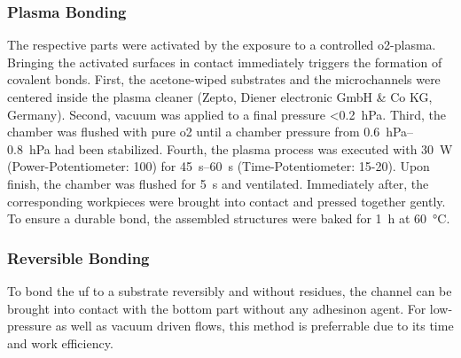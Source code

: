 \subsubsection{Plasma Bonding}
\label{sec:meth:bond:plasma}
The respective parts were activated by the exposure to a controlled \gls{o2}-plasma. Bringing the activated surfaces in contact immediately triggers the formation of covalent bonds. First, the acetone-wiped substrates and the microchannels were centered inside the plasma cleaner (Zepto, Diener electronic GmbH \& Co KG, Germany). Second, vacuum was applied to a final pressure <\SI{0.2}{\hecto\pascal}. Third, the chamber was flushed with pure \gls{o2} until a chamber pressure from \SIrange{0.6}{0.8}{\hecto\pascal} had been stabilized. Fourth, the plasma process was executed with \SI{30}{\watt} (Power-Potentiometer: 100) for \SIrange{45}{60}{\second} (Time-Potentiometer: 15-20). Upon finish, the chamber was flushed for \SI{5}{\second} and ventilated. Immediately after, the corresponding workpieces were brought into contact and pressed together gently. To ensure a durable bond, the assembled structures were baked for \SI{1}{\hour} at \SI{60}{\degreeCelsius}.
\subsubsection{Reversible Bonding}
To bond the \gls{uf} to a substrate reversibly and without residues, the channel can be brought into contact with the bottom part without any adhesinon agent. For low-pressure as well as vacuum driven flows, this method is preferrable due to its time and work efficiency.
